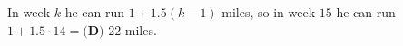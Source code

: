 In week $k$ he can run $1+1.5(k-1)$ miles, so in week $15$ he can run $1+1.5\cdot14=\boxed{\textbf{(D) }22}$ miles.
